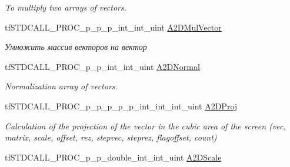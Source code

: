 \begin{DoxyCompactItemize}
\begin{DoxyCompactList}\small\item\em To multiply two arrays of vectors. \end{DoxyCompactList}\item 
\hypertarget{structs_functions_array_vector_c_p_u_a107ebf4f3a3fbea2b0664feeed8d425b}{tf\-S\-T\-D\-C\-A\-L\-L\-\_\-\-P\-R\-O\-C\-\_\-p\-\_\-p\-\_\-p\-\_\-int\-\_\-int\-\_\-uint \hyperlink{structs_functions_array_vector_c_p_u_a107ebf4f3a3fbea2b0664feeed8d425b}{A2\-D\-Mul\-Vector}}\label{structs_functions_array_vector_c_p_u_a107ebf4f3a3fbea2b0664feeed8d425b}

\begin{DoxyCompactList}\small\item\em Умножить массив векторов на вектор \end{DoxyCompactList}\item 
\hypertarget{structs_functions_array_vector_c_p_u_a0b0b8ba25ab78303da19c1e8f88b8bc0}{tf\-S\-T\-D\-C\-A\-L\-L\-\_\-\-P\-R\-O\-C\-\_\-p\-\_\-p\-\_\-int\-\_\-int\-\_\-uint \hyperlink{structs_functions_array_vector_c_p_u_a0b0b8ba25ab78303da19c1e8f88b8bc0}{A2\-D\-Normal}}\label{structs_functions_array_vector_c_p_u_a0b0b8ba25ab78303da19c1e8f88b8bc0}

\begin{DoxyCompactList}\small\item\em Normalization array of vectors. \end{DoxyCompactList}\item 
\hypertarget{structs_functions_array_vector_c_p_u_acd7cfe1f40048b963809c0cc00d3659a}{tf\-S\-T\-D\-C\-A\-L\-L\-\_\-\-P\-R\-O\-C\-\_\-p\-\_\-p\-\_\-p\-\_\-p\-\_\-p\-\_\-int\-\_\-int\-\_\-int\-\_\-uint \hyperlink{structs_functions_array_vector_c_p_u_acd7cfe1f40048b963809c0cc00d3659a}{A2\-D\-Proj}}\label{structs_functions_array_vector_c_p_u_acd7cfe1f40048b963809c0cc00d3659a}

\begin{DoxyCompactList}\small\item\em Calculation of the projection of the vector in the cubic area of the screen (vec, matrix, scale, offset, rez, stepvec, steprez, flagoffset, count) \end{DoxyCompactList}\item 
\hypertarget{structs_functions_array_vector_c_p_u_aaae0c9473d0dbcdbbbdc16dac5d24038}{tf\-S\-T\-D\-C\-A\-L\-L\-\_\-\-P\-R\-O\-C\-\_\-p\-\_\-p\-\_\-double\-\_\-int\-\_\-int\-\_\-uint \hyperlink{structs_functions_array_vector_c_p_u_aaae0c9473d0dbcdbbbdc16dac5d24038}{A2\-D\-Scale}}\label{structs_functions_array_vector_c_p_u_aaae0c9473d0dbcdbbbdc16dac5d24038}


\end{DoxyCompactItemize}
